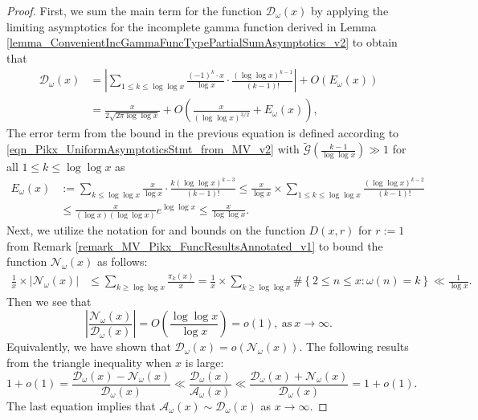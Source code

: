 \documentclass[11pt,reqno,a4letter]{article}
\numberwithin{figure}{section}
\numberwithin{table}{section}
\theoremstyle{plain}
\numberwithin{theorem}{section}
\theoremstyle{definition}
\begin{document}
\begin{proof} 
First, we sum the main term for the function $\mathcal{D}_{\omega}(x)$ by applying the limiting 
asymptotics for the incomplete gamma function derived in 
Lemma \ref{lemma_ConvenientIncGammaFuncTypePartialSumAsymptotics_v2} to obtain that 
\begin{align*} 
\mathcal{D}_{\omega}(x) & =  
     \left\lvert \sum_{1 \leq k \leq \log\log x} \frac{(-1)^k \cdot x}{\log x} \cdot 
     \frac{(\log\log x)^{k-1}}{(k-1)!} \right\rvert + O(E_{\omega}(x)) \\ 
     & = \frac{x}{2\sqrt{2\pi \log\log x}} + 
     O\left(\frac{x}{(\log\log x)^{3/2}} + E_{\omega}(x)\right), 
\end{align*}
The error term from the bound in the previous equation is defined according to 
\eqref{eqn_Pikx_UniformAsymptoticsStmt_from_MV_v2} with 
$\widetilde{\mathcal{G}}\left(\frac{k-1}{\log\log x}\right) \gg 1$ for all 
$1 \leq k \leq \log\log x$ as 
\begin{align*}
E_{\omega}(x) & := \sum_{k \leq \log\log x} \frac{x}{\log x} \cdot \frac{k (\log\log x)^{k-3}}{(k-1)!} 
     \leq \frac{x}{\log x} \times \sum_{1 \leq k \leq \log\log x} \frac{(\log\log x)^{k-2}}{(k-1)!} \\ 
     & \leq \frac{x}{(\log x)(\log\log x)} e^{\log\log x} \leq \frac{x}{\log\log x}. 
\end{align*}
Next, we utilize the notation for and bounds on the function $D(x, r)$ for $r := 1$ from 
Remark \ref{remark_MV_Pikx_FuncResultsAnnotated_v1} 
to bound the function $\mathcal{N}_{\omega}(x)$ as follows: 
\begin{align*}
\frac{1}{x} \times \left\lvert \mathcal{N}_{\omega}(x) \right\rvert & \leq 
     \sum_{k \geq \log\log x} \frac{\pi_k(x)}{x} = 
     \frac{1}{x} \times \sum_{k \geq \log\log x} \#\left\{2 \leq n \leq x: \omega(n)=k\right\} 
     \ll \frac{1}{\log x}. 
\end{align*} 
Then we see that 
\[
\left\lvert \frac{\mathcal{N}_{\omega}(x)}{\mathcal{D}_{\omega}(x)} \right\rvert = 
     O\left(\frac{\log\log x}{\log x}\right) = o(1), 
     \mathrm{\ as\ } x \rightarrow \infty. 
\]
Equivalently, we have shown that $\mathcal{D}_{\omega}(x) = o\left(\mathcal{N}_{\omega}(x)\right)$. 
The following results from the triangle inequality when $x$ is large: 
\[
1+o(1) = \frac{\mathcal{D}_{\omega}(x)- 
     \mathcal{N}_{\omega}(x)}{\mathcal{D}_{\omega}(x)} \ll 
     \frac{\mathcal{D}_{\omega}(x)}{\mathcal{A}_{\omega}(x)} \ll 
     \frac{\mathcal{D}_{\omega}(x)+\mathcal{N}_{\omega}(x)}{\mathcal{D}_{\omega}(x)} = 
     1 + o(1). 
\]
The last equation implies that 
$\mathcal{A}_{\omega}(x) \sim \mathcal{D}_{\omega}(x)$ as $x \rightarrow \infty$. 
\end{proof} 
\end{document}
